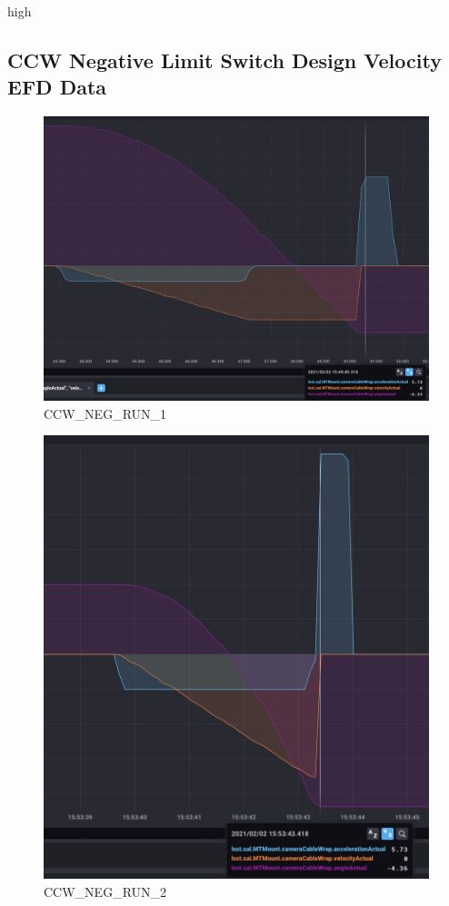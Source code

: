 high\documentclass[SE,lsstdraft,authoryear,toc]{lsstdoc}
\begin{document}
\subsection{CCW Negative Limit Switch Design Velocity EFD Data}
\begin{figure}[h!]
  \includegraphics[width=\linewidth]{media/CCW_design_speed_neg_test1.png}
  \caption{CCW\_NEG\_RUN\_1}
  \label{fig:CCW_NEG_RUN_1}
\end{figure}
\begin{figure}[h!]
  \includegraphics[width=\linewidth]{media/CCW_design_speed_neg_test2.png}
  \caption{CCW\_NEG\_RUN\_2}
  \label{fig:CCW_NEG_RUN_2}
\end{figure}
\end{document}
